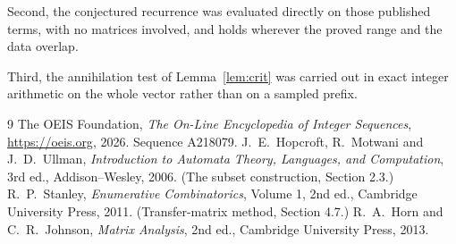 \documentclass[11pt,a4paper]{article}
\theoremstyle{plain}
\theoremstyle{definition}
\begin{document}
Second, the conjectured recurrence was evaluated directly on those published terms, with no
matrices involved, and holds wherever the proved range and the data overlap.

Third, the annihilation test of Lemma~\ref{lem:crit} was carried out in exact integer
arithmetic on the whole vector rather than on a sampled prefix.

\begin{thebibliography}{9}
 The OEIS Foundation, \emph{The On-Line Encyclopedia of Integer
Sequences}, \url{https://oeis.org}, 2026. Sequence A218079.
 J.~E.~Hopcroft, R.~Motwani and J.~D.~Ullman, \emph{Introduction to Automata
Theory, Languages, and Computation}, 3rd ed., Addison--Wesley, 2006. (The subset
construction, Section 2.3.)
 R.~P.~Stanley, \emph{Enumerative Combinatorics}, Volume 1, 2nd ed.,
Cambridge University Press, 2011. (Transfer-matrix method, Section 4.7.)
 R.~A.~Horn and C.~R.~Johnson, \emph{Matrix Analysis}, 2nd ed., Cambridge
University Press, 2013.
\end{thebibliography}
\end{document}
